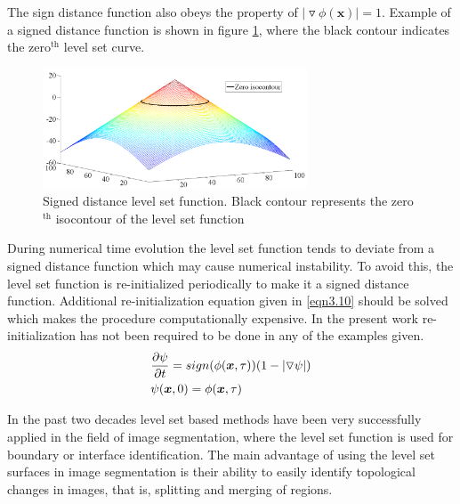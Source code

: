 \documentclass[10pt,letterpaper, onecolumn]{article}
\begin{document}
The sign distance function also obeys the property of $ \vert \triangledown \phi (\bm{x}) \vert = 1$. 
Example of a signed distance function is shown in figure \ref{fig:3.1}, where the black contour indicates the zero$^{\text{th}}$ level set curve.
%
%
%
\begin{figure}[t] %
  \begin{center}
    \includegraphics[width=0.7\textwidth,keepaspectratio=1,scale=1]{images/LSisocontour.png}
  \end{center}
  \caption{Signed distance level set function. Black contour represents the zero$^{\text{th}}$ isocontour of the level set function}
  \label{fig:3.1}
\end{figure}
%
%
During numerical time evolution the level set function tends to deviate from a signed distance function which may cause numerical instability. To avoid this, the level set function is re-initialized periodically to make it a signed distance function. Additional re-initialization equation given in \eqref{eqn3.10} should be solved which makes the procedure computationally expensive. In the present work re-initialization has not been required to be done in any of the examples given.
%
%
\begin{align}
&\frac{\partial \psi}{\partial t}  = sign(\phi(\bm{x}, \tau)) (1-\vert \triangledown \psi \vert) \notag \\
&\psi(\bm{x},0) = \phi(\bm{x}, \tau)
\label{eqn3.10}
\end{align}
%
%

In the past two decades level set based methods have been very successfully applied in the field of image segmentation, where the level set function is used for boundary or interface identification. The main advantage of using the level set surfaces in image segmentation is their ability to easily identify topological changes in images, that is, splitting and merging of regions.   



\end{document}
